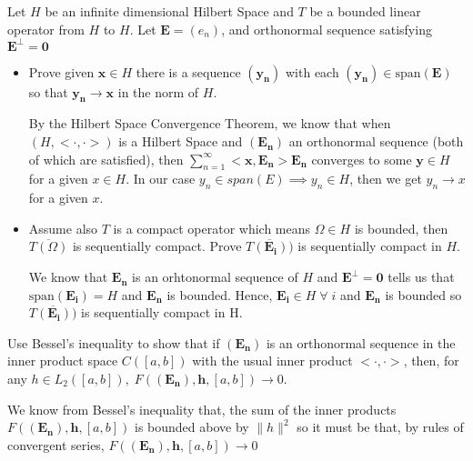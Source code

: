 \documentclass[11pt]{SelfArxOneColBMN}
\begin{document}
\begin{exercise}
    Let $H$ be an infinite dimensional Hilbert Space and $T$ be a bounded linear operator from $H$ to $H$. Let $\mathbf{E} = (e_n)$, and orthonormal sequence satisfying $\mathbf{E^\perp = 0}$
    \begin{itemize}
        \item Prove given $\mathbf{x} \in H$ there is a sequence $\mathbf{(y_n)}$ with each $\mathbf{(y_n)} \in \text{span}\mathbf{(E)}$ so that $\mathbf{y_n} \rightarrow \mathbf{x}$ in the norm of $H$.
        \begin{solution}
            By the Hilbert Space Convergence Theorem, we know that when $(H,<\cdot,\cdot>)$ is a Hilbert Space and $\mathbf{(E_n)}$ an orthonormal sequence (both of which are satisfied), then $\sum_{n=1}^\infty<\textbf{x},\mathbf{E_n}>\mathbf{E_n}$ converges to some $\textbf{y} \in H$ for a given $x \in H$. In our case $y_n \in span(E) \implies y_n \in H$, then we get $y_n \rightarrow x$ for a given $x$.
        \end{solution}
        \item Assume also $T$ is a compact operator which means $\Omega \in H$ is bounded, then $\overline{T(\Omega)}$ is sequentially compact. Prove $\overline{T(\mathbf{E_i}))}$ is sequentially compact in $H$.
        \begin{solution}
            We know that $\mathbf{E_n}$ is an orhtonormal sequence of $H$ and $\mathbf{E^\perp = 0}$ tells us that $\text{span}\mathbf{(E_i)} = H$ and $\mathbf{E_n}$ is bounded. Hence, $\mathbf{E_i} \in H \; \forall \; i$ and $\mathbf{E_n}$ is bounded so $\overline{T(\mathbf{E_i}))}$ is sequentially compact in H.
        \end{solution}
    \end{itemize}
\end{exercise}

\begin{exercise}
    Use Bessel's inequality to show that if $\mathbf{(E_n)}$ is an orthonormal sequence in the inner product space $C([a,b])$ with the usual inner product $<\cdot,\cdot>$, then, for any $h \in L_2([a,b]), \; F((\mathbf{E_n}),\mathbf{h},[a,b]) \rightarrow 0$.
    \begin{solution}
        We know from Bessel's inequality that, the sum of the inner products $F((\mathbf{E_n}),\mathbf{h},[a,b])$ is bounded above by $\|h\|^2$ so it must be that, by rules of convergent series,  $F((\mathbf{E_n}),\mathbf{h},[a,b]) \rightarrow 0$
    \end{solution}
\end{exercise}
\end{document}
